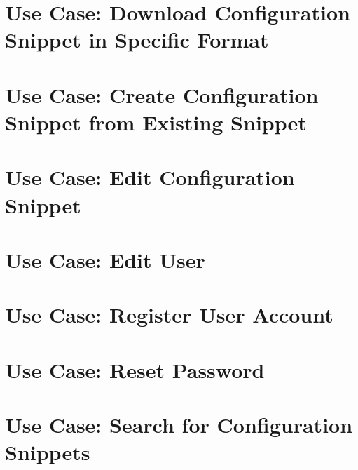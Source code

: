 \let\mypdfximage\pdfximage\def\pdfximage{\immediate\mypdfximage}\documentclass[twoside]{book}
\newcommand{\+}{\discretionary{\mbox{\scriptsize$\hookleftarrow$}}{}{}}
\begin{document}
\chapter{Use Case\+: Download Configuration Snippet in Specific Format}
\label{doc_usecases_snippet_sharing_UC_download_snippet_md}

\chapter{Use Case\+: Create Configuration Snippet from Existing Snippet}
\label{doc_usecases_snippet_sharing_UC_duplicate_snippet_md}

\chapter{Use Case\+: Edit Configuration Snippet}
\label{doc_usecases_snippet_sharing_UC_edit_snippet_md}

\chapter{Use Case\+: Edit User}
\label{doc_usecases_snippet_sharing_UC_edit_user_md}

\chapter{Use Case\+: Register User Account}
\label{doc_usecases_snippet_sharing_UC_register_md}

\chapter{Use Case\+: Reset Password}
\label{doc_usecases_snippet_sharing_UC_reset_password_md}

\chapter{Use Case\+: Search for Configuration Snippets}
\label{doc_usecases_snippet_sharing_UC_search_snippet_md}

\end{document}
